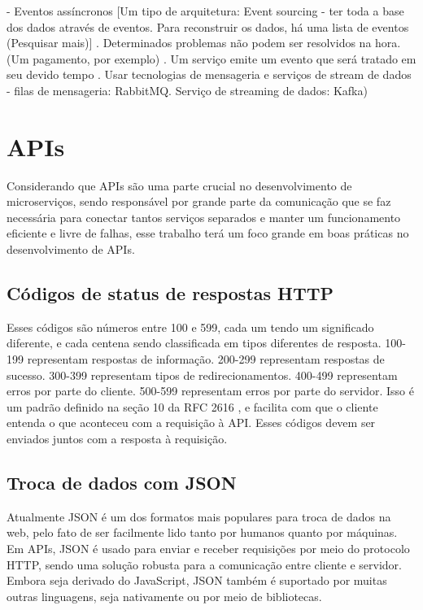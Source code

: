         - Eventos assíncronos
            [Um tipo de arquitetura: Event sourcing - ter toda a base dos dados através de eventos. Para reconstruir os dados, há uma lista de eventos (Pesquisar mais)]
            . Determinados problemas não podem ser resolvidos na hora. (Um pagamento, por exemplo)
            . Um serviço emite um evento que será tratado em seu devido tempo
            . Usar tecnologias de mensageria e serviços de stream de dados - filas de mensageria: RabbitMQ. Serviço de streaming de dados: Kafka)

\section{APIs}\label{boas-praticas-apis}

Considerando que APIs são uma parte crucial no desenvolvimento de microserviços, sendo responsável por grande parte da comunicação que se faz necessária para conectar tantos serviços separados e manter um funcionamento eficiente e livre de falhas, esse trabalho terá um foco grande em boas práticas no desenvolvimento de APIs.

\subsection{Códigos de status de respostas HTTP}
Esses códigos são números entre 100 e 599, cada um tendo um significado diferente, e cada centena sendo classificada em tipos diferentes de resposta. 100-199 representam respostas de informação. 200-299 representam respostas de sucesso. 300-399 representam tipos de redirecionamentos. 400-499 representam erros por parte do cliente. 500-599 representam erros por parte do servidor. Isso é um padrão definido na seção 10 da RFC 2616 \cite{rfc_http_nielsen_1999}, e facilita com que o cliente entenda o que aconteceu com a requisição à API. Esses códigos devem ser enviados juntos com a resposta à requisição.

\subsection{Troca de dados com JSON}
Atualmente JSON é um dos formatos mais populares para troca de dados na web, pelo fato de ser facilmente lido tanto por humanos quanto por máquinas. Em APIs, JSON é usado para enviar e receber requisições por meio do protocolo HTTP, sendo uma solução robusta para a comunicação entre cliente e servidor. Embora seja derivado do JavaScript, JSON também é suportado por muitas outras linguagens, seja nativamente ou por meio de bibliotecas.  \cite{json_bourhis_2020}


